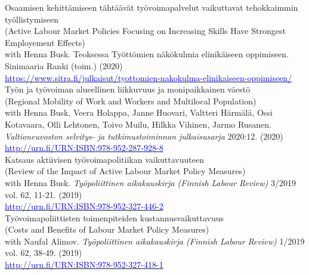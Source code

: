 \documentclass[16pt]{article}
\begin{document}
\noindent Osaamisen kehitt\"{a}miseen t\"{a}ht\"{a}\"{a}v\"{a}t ty\"{o}voimapalvelut vaikuttavat tehokkaimmin ty\"{o}llistymiseen \\
\noindent (Active Labour Market Policies Focusing on Increasing Skills Have Strongest Employement Effects) \\
\noindent with Henna Busk. Teoksessa Työttömien näkökulmia elinikäiseen oppimiseen. Sinimaaria Ranki (toim.) (2020)  \\
\noindent  \href{https://www.sitra.fi/julkaisut/tyottomien-nakokulma-elinikaiseen-oppimiseen/}{\textcolor{blue}{https://www.sitra.fi/julkaisut/tyottomien-nakokulma-elinikaiseen-oppimiseen/}} \\

\noindent Ty\"{o}n ja ty\"{o}voiman alueellinen liikkuvuus ja monipaikkainen v\"{a}est\"{o} \\
\noindent (Regional Mobility of Work and Workers and Multilocal Population) \\
\noindent with Henna Busk, Veera Holappa, Janne Huovari, Valtteri H\"{a}rm\"{a}l\"{a}, Ossi Kotavaara, Olli Lehtonen, Toivo Muilu, Hilkka Vihinen, Jarmo Rusanen. \textit{Valtioneuvoston selvitys- ja tutkimustoiminnan julkaisusarja} 2020:12. (2020)  \\
\noindent \href{http://urn.fi/URN:ISBN:978-952-287-928-8}{\textcolor{blue}{http://urn.fi/URN:ISBN:978-952-287-928-8}} \\

\noindent Katsaus aktiivisen ty\"{o}voimapolitiikan vaikuttavuuteen \\
\noindent (Review of the Impact of Active Labour Market Policy Measures) \\
\noindent with Henna Busk. \textit{Ty\"{o}poliittinen aikakauskirja (Finnish Labour Review)} 3/2019 vol. 62, 11-21.  (2019) \\
\noindent \href{http://urn.fi/URN:ISBN:978-952-327-446-2}{\textcolor{blue}{http://urn.fi/URN:ISBN:978-952-327-446-2}} \\

\noindent Ty\"{o}voimapoliittisten toimenpiteiden kustannusvaikuttavuus \\
\noindent (Costs and Benefits of Labour Market Policy Measures) \\
\noindent with Naufal Alimov. \textit{Ty\"{o}poliittinen aikakauskirja (Finnish Labour Review)} 1/2019 vol. 62, 38-49.  (2019) \\
\noindent \href{http://urn.fi/URN:ISBN:978-952-287-645-4}{\textcolor{blue}{http://urn.fi/URN:ISBN:978-952-327-418-1}} \\
\end{document}

